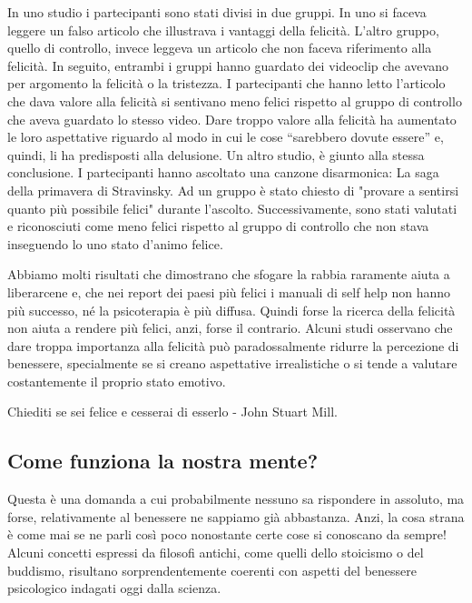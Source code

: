 \documentclass[12pt]{book} %
\begin{document}
In uno studio i partecipanti sono stati divisi in
due gruppi. In uno si faceva leggere un falso articolo che illustrava i vantaggi della felicità.
L'altro gruppo, quello di controllo, invece leggeva un articolo che non faceva riferimento alla
felicità. In seguito, entrambi i gruppi hanno guardato dei videoclip che avevano per argomento la felicità o la
tristezza. I partecipanti che hanno letto l'articolo che dava valore alla felicità si sentivano
meno felici rispetto al gruppo di controllo che aveva guardato lo stesso video. Dare troppo valore alla felicità ha
aumentato le loro aspettative riguardo al modo in cui le cose “sarebbero dovute essere” e, quindi, li ha predisposti
alla delusione. Un altro
studio, è giunto alla stessa conclusione. I partecipanti hanno ascoltato una canzone disarmonica: La saga della primavera di
Stravinsky. Ad un gruppo è stato chiesto di "provare a sentirsi quanto più possibile
felici" durante l'ascolto. Successivamente, sono stati valutati e
riconosciuti come meno felici rispetto al gruppo di controllo che non stava inseguendo lo uno stato
d'animo felice. 

Abbiamo molti risultati che dimostrano che sfogare la rabbia raramente aiuta a liberarcene e, che nei report dei paesi più felici i manuali di self help non hanno più successo,
né la psicoterapia è più diffusa. Quindi forse la ricerca della felicità non aiuta a rendere più felici, anzi, forse il
contrario. Alcuni studi osservano che dare troppa importanza alla felicità può paradossalmente ridurre la percezione di benessere, specialmente se si creano aspettative irrealistiche o si tende a valutare costantemente il proprio stato emotivo. 

Chiediti se sei felice e cesserai di esserlo - John Stuart Mill.

\subsection{Come funziona la nostra mente?}
Questa è una domanda a cui probabilmente nessuno sa rispondere in assoluto, ma forse, relativamente al benessere ne sappiamo già
abbastanza. Anzi, la cosa strana è come mai se ne parli così poco nonostante certe cose si conoscano da sempre! Alcuni concetti espressi da filosofi antichi, come quelli dello stoicismo o del buddismo, risultano sorprendentemente coerenti con aspetti del benessere psicologico indagati oggi dalla scienza.
\end{document}
